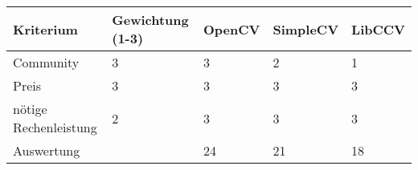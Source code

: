 \begin{table}[h]
\begin{tabular}{|p{4.5cm}|p{3.5cm}|p{2cm}|p{2cm}|p{2cm}|}\hline
	
	\textbf{Kriterium}	& 	\textbf{Gewichtung (1-3)} & \textbf{OpenCV} & \textbf{SimpleCV} & \textbf{LibCCV}\\\hline
	Community & 3 & 3 & 2 & 1\\\hline
	Preis & 3 & 3 & 3 & 3 \\\hline
	nötige Rechenleistung & 2 & 3 & 3 & 3 \\\hline
	Auswertung &  & 24 & 21 & 18\\\hline
	
	
	
	
\end{tabular}\\
\end{table}